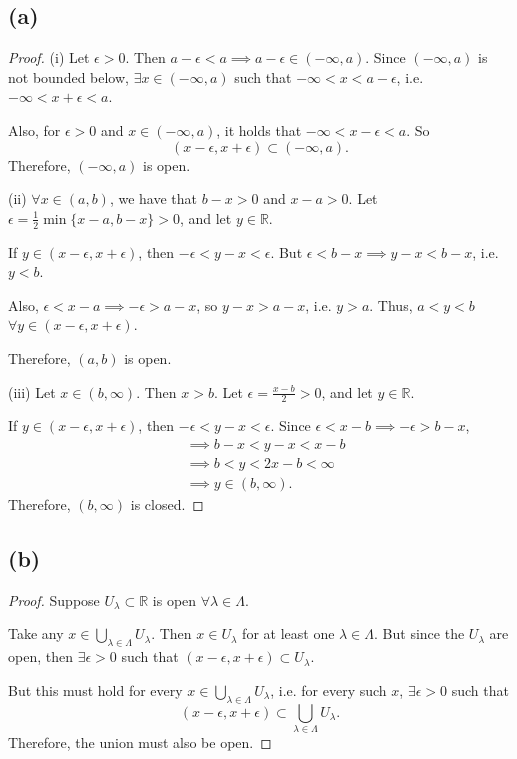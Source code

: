 \documentclass{article}
\begin{document}
\subsection*{(a)}
\begin{proof}
	(i) Let $\epsilon>0$. Then $a-\epsilon < a \implies a-\epsilon \in (-\infty, a)$.
	Since $(-\infty, a)$ is not bounded below, $\exists x \in (-\infty, a)$ such that $-\infty < x < a-\epsilon$, i.e. $-\infty < x+\epsilon<a$. 
	
	Also, for $\epsilon>0$ and $x\in(-\infty,a)$, it holds that $-\infty<x-\epsilon<a$. So
	\begin{equation}
		(x-\epsilon, x+\epsilon) \subset (-\infty,a).
	\end{equation}
	Therefore, $(-\infty, a)$ is open.
	
	(ii) $\forall x \in (a,b)$, we have that $b-x>0$ and $x-a>0$. Let $\epsilon = \frac{1}{2}\min\{x-a, b-x\}>0$, and let $y\in\mathbb{R}$.
	
	If $y\in(x-\epsilon, x+\epsilon)$, then $-\epsilon<y-x<\epsilon$. But $\epsilon < b-x \implies y-x < b-x$, i.e. $y<b$.
	
	Also, $\epsilon < x-a\implies -\epsilon>a-x$, so $y-x>a-x$, i.e. $y>a$. Thus, $a<y<b$ $\forall y\in(x-\epsilon, x+\epsilon)$.
	
	Therefore, $(a,b)$ is open.
	
	(iii) Let $x\in (b, \infty)$. Then $x>b$. Let $\epsilon = \frac{x-b}{2}>0$, and let $y\in\mathbb{R}$. 
	
	If $y\in(x-\epsilon, x+\epsilon)$, then $-\epsilon<y-x<\epsilon$. Since $\epsilon<x-b \implies -\epsilon>b-x$, 
	\begin{align}
		&\implies b-x<y-x<x-b \\
		&\implies b<y<2x-b< \infty \\
		&\implies y \in (b, \infty).
	\end{align}
	Therefore, $(b, \infty)$ is closed. 
\end{proof}

\subsection*{(b)}
\begin{proof}
	Suppose $U_{\lambda}\subset \mathbb{R}$ is open $\forall \lambda \in \Lambda$. 
	
	Take any $x\in\bigcup_{\lambda\in\Lambda}U_{\lambda}$. Then $x\in U_{\lambda}$ for at least one $\lambda\in\Lambda$. But since the $U_{\lambda}$ are open, then $\exists \epsilon >0$ such that $(x-\epsilon, x+\epsilon)\subset U_{\lambda}$. 
	
	But this must hold for every $x\in\bigcup_{\lambda\in\Lambda}U_{\lambda}$, i.e. for every such $x$, $\exists \epsilon>0$ such that
	\begin{equation}
		(x-\epsilon, x+\epsilon)\subset \bigcup_{\lambda\in\Lambda}U_{\lambda}.
	\end{equation} 
	Therefore, the union must also be open.
\end{proof}
\end{document}
